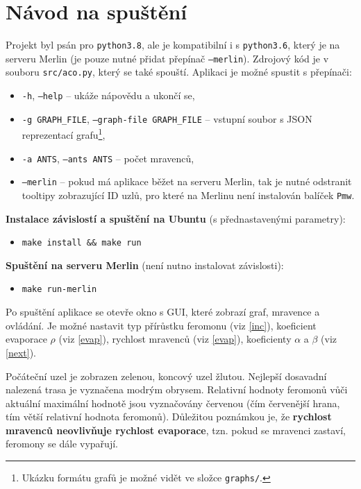 \documentclass[12pt]{article}
\begin{document}
\newpage
\section{Návod na spuštění}
Projekt byl psán pro \texttt{python3.8}, ale je kompatibilní i s \texttt{python3.6}, který je na serveru Merlin (je pouze nutné přidat přepínač \texttt{--merlin}). Zdrojový kód je v souboru \texttt{src/aco.py}, který se také spouští. Aplikaci je možné spustit s přepínači:

\begin{itemize}
    \item[] \texttt{-h}, \texttt{--help} -- ukáže nápovědu a ukončí se,
    \item[] \texttt{-g GRAPH\_FILE}, \texttt{--graph-file GRAPH\_FILE} -- vstupní soubor s JSON reprezentací grafu\footnote{Ukázku formátu grafů je možné vidět ve složce \texttt{graphs/}.},
    \item[] \texttt{-a ANTS}, \texttt{--ants ANTS} -- počet mravenců,
    \item[] \texttt{--merlin} -- pokud má aplikace běžet na serveru Merlin, tak je nutné odstranit tooltipy zobrazující ID uzlů, pro které na Merlinu není instalován balíček \texttt{Pmw}.
\end{itemize}

\textbf{Instalace závislostí a spuštění na Ubuntu} (s přednastavenými parametry):
\begin{itemize}
    \item[] \texttt{make install \&\& make run}
\end{itemize}

\textbf{Spuštění na serveru Merlin} (není nutno instalovat závislosti):
\begin{itemize}
    \item[] \texttt{make run-merlin}
\end{itemize}

Po spuštění aplikace se otevře okno s GUI, které zobrazí graf, mravence a ovládání. Je možné nastavit typ přírůstku feromonu (viz \ref{inc}), koeficient evaporace $ \rho $ (viz \ref{evap}), rychlost mravenců (viz \ref{evap}), koeficienty $ \alpha $ a $ \beta $ (viz \ref{next}). 

Počáteční uzel je zobrazen zelenou, koncový uzel žlutou. Nejlepší dosavadní nalezená trasa je vyznačena modrým obrysem. Relativní hodnoty feromonů vůči aktuální maximální hodnotě jsou vyznačovány červenou (čím červenější hrana, tím větší relativní hodnota feromonů). Důležitou poznámkou je, že \textbf{rychlost mravenců neovlivňuje rychlost evaporace}, tzn. pokud se mravenci zastaví, feromony se dále vypařují. 

\newpage
 

\end{document}
